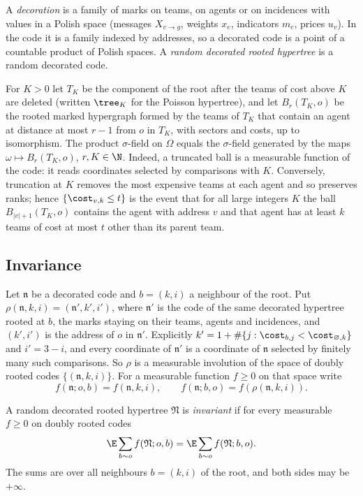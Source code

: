 A \emph{decoration} is a family of marks on teams, on agents or on incidences with values in a
Polish space (messages $X_{v\to g}$, weights $x_e$, indicators $m_e$, prices $u_v$). In the
code it is a family indexed by addresses, so a decorated code is a point of a countable product
of Polish spaces. A \emph{random decorated rooted hypertree} is a random decorated code.

\begin{remark}\label{rem:tree-balls}
For $K>0$ let $T_K$ be the component of the root after the teams of cost above $K$ are deleted
(written $\tree_K$ for the Poisson hypertree), and let $B_r(T_K,o)$ be the rooted marked
hypergraph formed by the teams of $T_K$ that contain an agent at distance at most $r-1$ from
$o$ in $T_K$, with sectors and costs, up to isomorphism. The product $\sigma$-field on $\Omega$ equals the $\sigma$-field generated by the
maps $\omega\mapsto B_r(T_K,o)$, $r,K\in\N$. Indeed, a truncated ball is a measurable function
of the code: it reads coordinates selected by comparisons with $K$. Conversely, truncation at
$K$ removes the most expensive teams at each agent and so preserves ranks; hence
$\{\cost_{v,k}\le t\}$ is the event that for all large integers $K$ the ball $B_{|v|+1}(T_K,o)$
contains the agent with address $v$ and that agent has at least $k$ teams of cost at most $t$
other than its parent team.
\end{remark}

\subsection{Invariance}\label{subsec:tree-invariance}

Let $\mathfrak{n}$ be a decorated code and $b=(k,i)$ a neighbour of the root. Put
$\rho(\mathfrak{n},k,i)=(\mathfrak{n}',k',i')$, where $\mathfrak{n}'$ is the code of the same
decorated hypertree rooted at $b$, the marks staying on their teams, agents and incidences, and
$(k',i')$ is the address of $o$ in $\mathfrak{n}'$. Explicitly
$k'=1+\#\{j:\cost_{b,j}<\cost_{\varnothing,k}\}$ and $i'=3-i$, and every coordinate of
$\mathfrak{n}'$ is a coordinate of $\mathfrak{n}$ selected by finitely many such comparisons.
So $\rho$ is a measurable involution of the space of doubly rooted codes
$\{(\mathfrak{n},k,i)\}$. For a measurable function $f\ge0$ on that space write
\[
  f(\mathfrak{n};o,b)=f(\mathfrak{n},k,i),\qquad f(\mathfrak{n};b,o)=f(\rho(\mathfrak{n},k,i)).
\]

\begin{definition}[invariance]\label{def:tree-invariant}
A random decorated rooted hypertree $\mathfrak{N}$ is \emph{invariant} if for every measurable
$f\ge0$ on doubly rooted codes
\begin{equation}\label{eq:tree-MT}
  \E\sum_{b\sim o}f(\mathfrak{N};o,b)=\E\sum_{b\sim o}f(\mathfrak{N};b,o).
\end{equation}
The sums are over all neighbours $b=(k,i)$ of the root, and both sides may be $+\infty$.
\end{definition}

